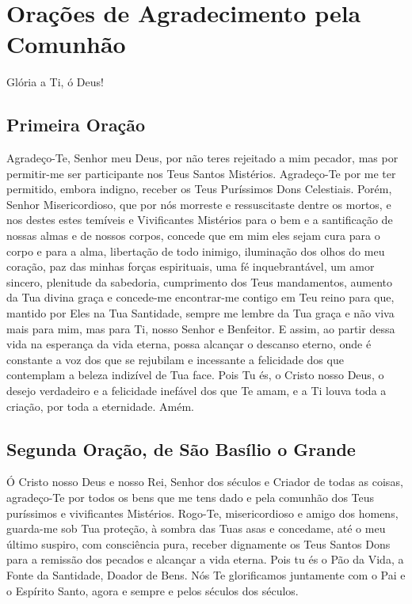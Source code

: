 \documentclass{subfiles}
\begin{document}
\chapter{Orações de Agradecimento pela Comunhão}


\priest{}Glória a Ti, ó Deus! \thrice{}

\section*{Primeira Oração}

\reader{}Agradeço-Te, Senhor meu Deus, por não teres rejeitado a mim pecador,
mas por permitir-me ser participante nos Teus Santos Mistérios. Agradeço-Te
por me ter permitido, embora indigno, receber os Teus Puríssimos Dons
Celestiais. Porém, Senhor Misericordioso, que por nós morreste e ressuscitaste
dentre os mortos, e nos destes estes temíveis e Vivificantes Mistérios para o
bem e a santificação de nossas almas e de nossos corpos, concede que em mim
eles sejam cura para o corpo e para a alma, libertação de todo inimigo,
iluminação dos olhos do meu coração, paz das minhas forças espirituais, uma
fé inquebrantável, um amor sincero, plenitude da sabedoria, cumprimento dos
Teus mandamentos, aumento da Tua divina graça e concede-me encontrar-me
contigo em Teu reino para que, mantido por Eles na Tua Santidade, sempre me
lembre da Tua graça e não viva mais para mim, mas para Ti, nosso Senhor e
Benfeitor. E assim, ao partir dessa vida na esperança da vida eterna, possa
alcançar o descanso eterno, onde é constante a voz dos que se rejubilam e
incessante a felicidade dos que contemplam a beleza indizível de Tua face. Pois
Tu és, o Cristo nosso Deus, o desejo verdadeiro e a felicidade inefável dos que
Te amam, e a Ti louva toda a criação, por toda a eternidade. Amém.

\section*{Segunda Oração, de São Basílio o Grande}

Ó Cristo nosso Deus e nosso Rei, Senhor dos séculos e Criador de todas as
coisas, agradeço-Te por todos os bens que me tens dado e pela comunhão dos Teus
puríssimos e vivificantes Mistérios. Rogo-Te, misericordioso e amigo dos homens,
guarda-me sob Tua proteção, à sombra das Tuas asas e concedame, até o meu último
suspiro, com consciência pura, receber dignamente os Teus Santos Dons para a
remissão dos pecados e alcançar a vida eterna. Pois tu és o Pão da Vida, a Fonte
da Santidade, Doador de Bens. Nós Te glorificamos juntamente com o Pai e o
Espírito Santo, agora e sempre e pelos séculos dos séculos.
\end{document}
